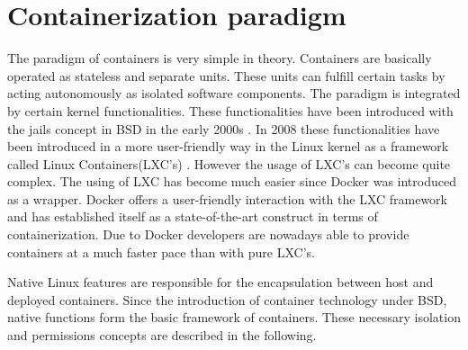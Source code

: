\section{Containerization paradigm}
\label{sec:intro:containerization}
%
% 
The paradigm of containers is very simple in theory. Containers are basically operated as stateless and separate units. These units can fulfill certain tasks by acting autonomously as isolated software components.
The paradigm is integrated by certain kernel functionalities. These functionalities have been introduced with the jails concept in BSD in the early 2000s \cite{Souppaya:2017aa}. In 2008 these functionalities have been introduced in a more user-friendly way in the Linux kernel as a framework called Linux Containers(LXC's) \cite{Souppaya:2017aa}.
However the usage of LXC's can become quite complex. The using of LXC has become much easier since Docker was introduced as a wrapper. Docker offers a user-friendly interaction with the LXC framework and has established itself as a state-of-the-art construct in terms of containerization.
Due to Docker developers are nowadays able to provide containers at a much faster pace than with pure LXC's. 
	
Native Linux features are responsible for the encapsulation between host and deployed containers.
Since the introduction of container technology under BSD, native functions form the basic framework of containers.
These necessary isolation and permissions concepts are described in the following.